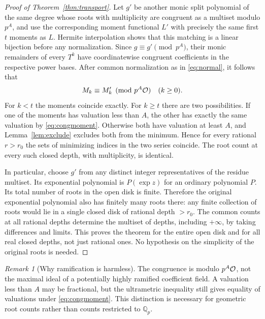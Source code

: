 \documentclass[11pt]{article}
\theoremstyle{remark}\newtheorem{remark}[theorem]{Remark}
\newcommand{\Q}{\mathbb Q}\newcommand{\Z}{\mathbb Z}\newcommand{\F}{\mathbb F}\newcommand{\C}{\mathbb C}
\begin{document}
\begin{proof}[Proof of Theorem~\ref{thm:transport}]
Let $g'$ be another monic split polynomial of the same degree whose roots with
multiplicity are congruent as a multiset modulo $p^A$, and use the corresponding
moment functional $L'$ with precisely the same first $t$ moments as $L$.
Hermite interpolation shows that this matching is a linear bijection before any
normalization. Since $g\equiv g'\pmod{p^A}$, their monic remainders of every $T^k$
have coordinatewise congruent coefficients in the respective power bases. After
common normalization as in \eqref{eq:normal}, it follows that
\begin{equation}\label{eq:congmoment}
 M_k\equiv M'_k\pmod{p^A\mathcal O}\quad(k\ge0).
\end{equation}
For $k<t$ the moments coincide exactly. For $k\ge t$ there are two possibilities.
If one of the moments has valuation less than $A$, the other has exactly the same
valuation by \eqref{eq:congmoment}. Otherwise both have valuation at least $A$, and
Lemma~\ref{lem:exclude} excludes both from the minimum. Hence for every rational
$r>r_0$ the sets of minimizing indices in the two series coincide. The root count
at every such closed depth, with multiplicity, is identical.

In particular, choose $g'$ from any distinct integer representatives of the
residue multiset. Its exponential polynomial is $P(\exp z)$ for an ordinary
polynomial $P$. Its total number of roots in the open disk is finite. Therefore the
original exponential polynomial also has finitely many roots there: any finite
collection of roots would lie in a single closed disk of rational depth $>r_0$.
The common counts at all rational depths determine the multiset of depths, including
$+\infty$, by taking differences and limits. This proves the theorem for the entire
open disk and for all real closed depths, not just rational ones. No hypothesis on
the simplicity of the original roots is needed.
\end{proof}

\begin{remark}[Why ramification is harmless]
The congruence is modulo $p^A\mathcal O$, not the maximal ideal of a potentially highly
ramified coefficient field. A valuation less than $A$ may be fractional, but the
ultrametric inequality still gives equality of valuations under
\eqref{eq:congmoment}. This distinction is necessary for geometric root counts
rather than counts restricted to $\Q_p$.
\end{remark}
\end{document}

